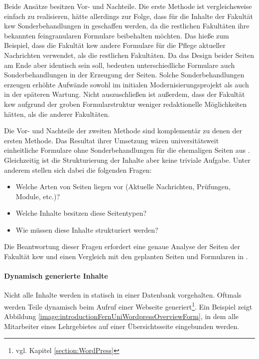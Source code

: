         Beide Ansätze besitzen Vor- und Nachteile.
        Die erste Methode ist vergleichsweise einfach zu realisieren,
        hätte allerdings zur Folge, dass für die Inhalte der Fakultät \gls{ksw} Sonderbehandlungen
        in {\imperia} geschaffen werden, da die restlichen Fakultäten ihre bekannten feingranularen
        Formulare beibehalten möchten.
        Das hieße zum Beispiel, dass die Fakultät \gls{ksw} andere Formulare für die Pflege aktueller
        Nachrichten verwendet, als die restlichen Fakultäten.
        Da das Design beider Seiten am Ende aber identisch sein soll, bedeuten unterschiedliche Formulare
        auch Sonderbehandlungen in der Erzeugung der Seiten.
        Solche Sonderbehandlungen erzeugen erhöhte Aufwände sowohl im initialen Modernisierungsprojekt
        als auch in der späteren Wartung.
        Nicht auszuschließen ist außerdem, dass {\editors} der Fakultät \gls{ksw} aufgrund der groben Formularstruktur
        weniger redaktionelle Möglichkeiten hätten, als die anderer Fakultäten.

        Die Vor- und Nachteile der zweiten Methode sind komplementär zu denen der ersten Methode.
        Das Resultat ihrer Umsetzung wären universitätsweit einheitliche Formulare
        ohne Sonderbehandlungen für die ehemaligen Seiten aus {\wordpress}.
        Gleichzeitig ist die Strukturierung der Inhalte aber keine triviale Aufgabe.
        Unter anderem stellen sich dabei die folgenden Fragen:

        \begin{itemize}
            \item Welche Arten von Seiten liegen vor (Aktuelle Nachrichten, Prüfungen, Module, etc.)?
            \item Welche Inhalte besitzen diese Seitentypen?
            \item Wie müssen diese Inhalte strukturiert werden?
        \end{itemize}

        Die Beantwortung dieser Fragen erfordert eine genaue Analyse der Seiten der Fakultät \gls{ksw}
        und einen Vergleich mit den geplanten Seiten und Formularen in {\imperia}.
        
        \paragraph{Dynamisch generierte Inhalte}
        Nicht alle Inhalte werden in {\wordpress} statisch in einer Datenbank vorgehalten.
        Oftmals werden Teile dynamisch beim Aufruf einer Webseite
        generiert\footnote{vgl. Kapitel \ref{section:WordPress}}.
        Ein Beispiel zeigt Abbildung \ref{image:introductionFernUniWordpressOverviewForm},
        in dem alle Mitarbeiter eines Lehrgebietes auf einer Übersichtsseite eingebunden werden.

